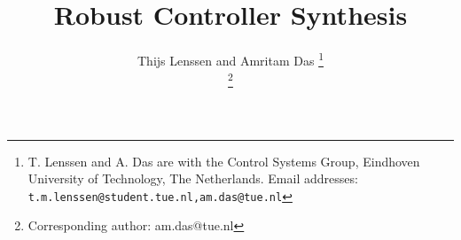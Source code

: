 \documentclass[journal,10pt,twoside,a4paper]{IEEEtran}
\begin{document}
\onecolumn

\title{Robust Controller Synthesis}


\author{Thijs Lenssen and Amritam Das%
\thanks{T. Lenssen and A. Das are with the Control Systems Group, Eindhoven University of Technology, The Netherlands. Email addresses: \small{\tt\small{t.m.lenssen@student.tue.nl,am.das@tue.nl}}}

\thanks{Corresponding author: am.das@tue.nl}}%
\end{document}
